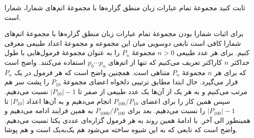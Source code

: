ثابت کنید مجموعهٔ تمام عبارات زبان منطق گزاره‌ها با مجموعهٔ اتم‌های شمارا، شمارا است.
\begin{ans}
  برای اثبات شمارا بودن مجموعهٔ تمام عبارات زبان منطق گزاره‌ها با مجموعهٔ اتم‌های شمارا کافی است تابعی دوسویی میان این مجموعه و مجموعهٔ اعداد طبیعی معرفی کنیم. برای هر عدد طبیعی 
  $n>0$
  مجموعهٔ
  $P_n$
  را به عنوان مجموعهٔ فرمول‌هایی با طول حداکثر $n$ کاراکتر تعریف می‌کنیم که تنها از اتم‌های
  $p_0\cdots p_n$
  استفاده می‌کنند. واضح است که برای هر $n$ مجموعهٔ $P_n$ متناهی است. همچنین واضح است که هر فرمول در یک $P_n$ قرار می‌گیرد.
  حال ابتدا مطابق ترتیبی دلخواه اعضای مجموعهٔ
  $P_{10}$
  را پشت سر هم مرتب می‌کنیم و به هر یک از آن‌ها یک عدد طبیعی از صفر تا $|P_{10}|-1$ نسبت می‌دهیم. سپس همین کار را برای اعضای $P_{100}/P_{10}$ انجام می‌دهیم و به آن‌ها اعداد $|P_{10}|$ تا $|P_{100}|-1$ را نسبت می‌دهیم. بعد برای $P_{1000}/P_{100}$ به همین فرایند ادامه می‌دهیم و همینطور الی آخر. با ادامهٔ همین روند به هر فرمول گزاره‌ای عددی یکتا نسبت می‌دهیم. واضح است که تابعی که به این شیوه ساخته می‌شود هم یک‌به‌یک است و هم پوشا.
\end{ans}
